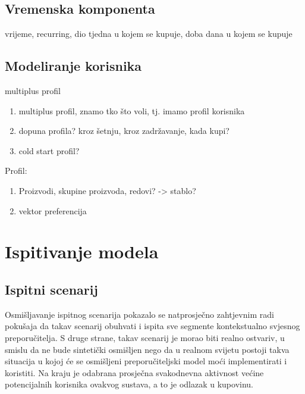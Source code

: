 \documentclass[times, utf8, diplomski, numeric]{fer}
\begin{document}
\section{Vremenska komponenta}
vrijeme, recurring, dio tjedna u kojem se kupuje, doba dana u kojem se kupuje

\section{Modeliranje korisnika}
multiplus profil

\begin{enumerate}
  \item multiplus profil, znamo tko što voli, tj. imamo profil korisnika
  \item dopuna profila? kroz šetnju, kroz zadržavanje, kada kupi?
  \item cold start profil?
\end{enumerate}

Profil:
\begin{enumerate}
  \item Proizvodi, skupine proizvoda, redovi? -> stablo?
  \item vektor preferencija
\end{enumerate}

\chapter{Ispitivanje modela}
\section{Ispitni scenarij}
Osmišljavanje ispitnog scenarija pokazalo se natprosječno zahtjevnim radi
pokušaja da takav scenarij obuhvati i ispita sve segmente kontekstualno svjesnog
preporučitelja. S druge strane, takav scenarij je morao biti realno
ostvariv, u smislu da ne bude sintetički osmišljen nego da u realnom
svijetu postoji takva situacija u kojoj će se osmišljeni preporučiteljski
model moći implementirati i koristiti. Na kraju je odabrana prosječna
svakodnevna aktivnost većine potencijalnih korisnika ovakvog sustava, a to je
odlazak u kupovinu.
\end{document}
